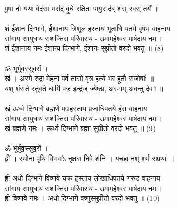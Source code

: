 पू॒षा नो॒ यथा॒ वेद॑सा॒ मस॑द् वृ॒धे र॒क्षि॒ता पायु॒र द॑ब् शस् स्व॒स् तये᳚ ॥\\
\\
शं ईशान दिग्भागे, ईशानाय त्रिशूल हस्ताय भूताधि पतये वृषभ वाहनाय\\
सांगाय सायुधाय सशक्तिस परिवाराय -  उमामहेश्वर पार्षदाय नमः।\\
शं ईशानाय नमः  ईशान्य दिग्भागे, ईशानः सुप्रीतो  वरदो भवतु ॥ (8)\\
\\
ॐ भूर्भुव॒स्सुव॒रों ।\\
खं । अ॒स्मे रु॒द्रा मे॒हना॒ पर्व॑ तासो वृत्र॒ हत्ये॒ भर॑ हूतौ स॒जोषाः᳚ ॥\\
यश् शंस॑ते स्तुव॒ते धायि॑ प॒ज्र इन्द्र॑ज् ज्येष्ठा, अ॒स्माम् अ॑वन्तु दे॒वाः ॥\\
\\
खं ऊर्ध्व दिग्भागे ब्रह्मणे पद्महस्ताय प्रजाधिपतये हंस वाहनाय\\
सांगाय सायुधाय सशक्तिस परिवाराय -  उमामहेश्वर पार्षदाय नमः।\\
खं ब्रह्मणे नमः । ऊर्ध्व दिग्भागे ब्रह्मा सुप्रीतो  वरदो भवतु ॥  (9)\\
\\
ॐ भूर्भुव॒स्सुव॒रों ।\\
ह्रीं । स्यो॒ना पृ॑थि विभवा॑ऽ नृक्ष॒रा नि॒वे श॑नि । यच्छा॑ न॒श् शर्म॑ स॒प्रथाः᳚ ।\\
\\
ह्रीं अधो दिग्भागे विष्णवे चक्र हस्ताय लोखाधिपतये गरुड वाहनाय\\
सांगाय सायुधाय सशक्तिस परिवाराय -  उमामहेश्वर पार्षदाय नमः।\\
ह्रीं विष्णवे नमः । अधो दिग्भागे वष्णुस्सुप्रीतो वरदो भवतु ॥  (10)\\
\\
